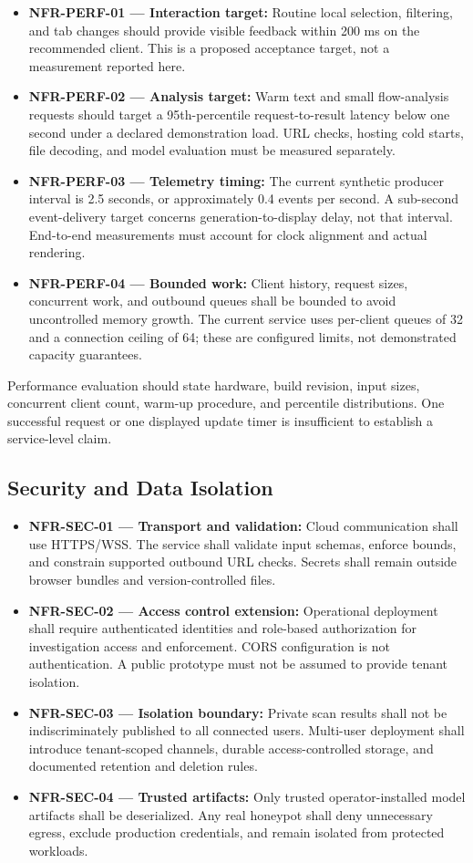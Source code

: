 \documentclass[12pt,a4paper,oneside]{report}
\newcommand{\req}[2]{\item \textbf{#1:} #2}
\begin{document}
\begin{itemize}
\req{NFR-PERF-01 --- Interaction target}{Routine local selection, filtering, and tab changes should provide visible feedback within 200 ms on the recommended client. This is a proposed acceptance target, not a measurement reported here.}
\req{NFR-PERF-02 --- Analysis target}{Warm text and small flow-analysis requests should target a 95th-percentile request-to-result latency below one second under a declared demonstration load. URL checks, hosting cold starts, file decoding, and model evaluation must be measured separately.}
\req{NFR-PERF-03 --- Telemetry timing}{The current synthetic producer interval is 2.5 seconds, or approximately 0.4 events per second. A sub-second event-delivery target concerns generation-to-display delay, not that interval. End-to-end measurements must account for clock alignment and actual rendering.}
\req{NFR-PERF-04 --- Bounded work}{Client history, request sizes, concurrent work, and outbound queues shall be bounded to avoid uncontrolled memory growth. The current service uses per-client queues of 32 and a connection ceiling of 64; these are configured limits, not demonstrated capacity guarantees.}
\end{itemize}

Performance evaluation should state hardware, build revision, input sizes, concurrent client count, warm-up procedure, and percentile distributions. One successful request or one displayed update timer is insufficient to establish a service-level claim.

\subsection{Security and Data Isolation}

\begin{itemize}
\req{NFR-SEC-01 --- Transport and validation}{Cloud communication shall use HTTPS/WSS. The service shall validate input schemas, enforce bounds, and constrain supported outbound URL checks. Secrets shall remain outside browser bundles and version-controlled files.}
\req{NFR-SEC-02 --- Access control extension}{Operational deployment shall require authenticated identities and role-based authorization for investigation access and enforcement. CORS configuration is not authentication. A public prototype must not be assumed to provide tenant isolation.}
\req{NFR-SEC-03 --- Isolation boundary}{Private scan results shall not be indiscriminately published to all connected users. Multi-user deployment shall introduce tenant-scoped channels, durable access-controlled storage, and documented retention and deletion rules.}
\req{NFR-SEC-04 --- Trusted artifacts}{Only trusted operator-installed model artifacts shall be deserialized. Any real honeypot shall deny unnecessary egress, exclude production credentials, and remain isolated from protected workloads.}
\end{itemize}
\end{document}
